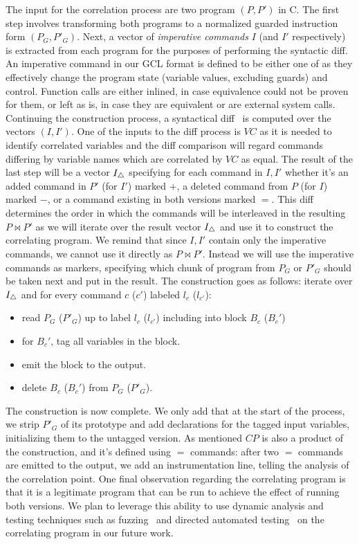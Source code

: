 The input for the correlation process are two program $(P,P')$ in C. The first step involves transforming both programs to a normalized guarded instruction form $(P_{G},P'_{G})$. Next, a vector of \emph{imperative commands} $I$ (and $I'$ respectively) is extracted from each program for the purposes of performing the syntactic diff. An imperative command in our GCL format is defined to be either one of  as they effectively change the program state (variable values, excluding guards) and control. Function calls are either inlined, in case equivalence could not be proven for them, or left as is, in case they are equivalent or are external system calls. Continuing the construction process, a syntactical diff~\cite{HuntMcIlroy75} is computed over the vectors $(I,I')$. One of the inputs to the diff process is $VC$ as it is needed to identify correlated variables and the diff comparison will regard commands differing by variable names which are correlated by $VC$ as equal. The result of the last step will be a vector $I_{\triangle}$ specifying for each command in $I,I'$ whether it's an added command in $P'$ (for $I'$) marked $+$, a deleted command from $P$ (for $I$) marked $-$, or a command existing in both versions marked $=$. This diff determines the order in which the commands will be interleaved in the resulting $P \bowtie P'$ as we will iterate over the result vector $I_{\triangle}$ and use it to construct the correlating program. We remind that since $I,I'$ contain only the imperative commands, we cannot use it directly as $P \bowtie P'$. Instead we will use the imperative commands as markers, specifying which chunk of program from $P_G$ or $P'_G$ should be taken next and put in the result. The construction goes as follows: iterate over $I_{\triangle}$ and for every command $c$ ($c'$) labeled $l_c$ ($l_{c'}$):
\begin{itemize}
\item read $P_G$ ($P'_G$) up to label $l_c$ ($l_{c'}$) including into block $B_c$ ($B_c'$)
\item for $B_c'$, tag all variables in the block.
\item emit the block to the output.
\item delete $B_c$ ($B_c'$) from $P_G$ ($P'_G$).
\end{itemize}
The construction is now complete. We only add that at the start of the process, we strip $P'_G$ of its prototype and add declarations for the tagged input variables, initializing them to the untagged version.
As mentioned $CP$ is also a product of the construction, and it's defined using $=$ commands: after two $=$ commands are emitted to the output, we add an instrumentation line, telling the analysis of the correlation point.
One final observation regarding the correlating program is that it is a legitimate program that can be run to achieve the effect of running both versions. We plan to leverage this ability to use dynamic analysis and testing techniques such as fuzzing~\cite{NethercoteSeward07} and directed automated testing~\cite{CadarDunbarEngler08} on the correlating program in our future work.
